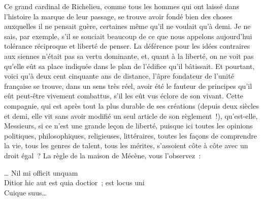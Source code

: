 \documentclass[french,twoside]{book} %
\newcommand\persName[1]{#1}
\newcommand{\dateline}[1]{\medskip{\RaggedLeft{#1}\par}\bigskip}
\newcommand{\salute}[1]{\bigbreak{#1}\par\medbreak}
\begin{document}
\dateline{3 avril 1879}

\salute{Messieurs,}
\noindent Ce grand {\persName cardinal de Richelieu}, comme tous les hommes qui ont laissé dans l’histoire la marque de leur passage, se trouve avoir fondé bien des choses auxquelles il ne pensait guère, certaines même qu’il ne voulait qu’à demi. Je ne sais, par exemple, s’il se souciait beaucoup de ce que nous appelons aujourd’hui tolérance réciproque et liberté de penser. La déférence pour les idées contraires aux siennes n’était pas sa vertu dominante, et, quant à la liberté, on ne voit pas qu’elle eût sa place indiquée dans le plan de l’édifice qu’il bâtissait. Et pourtant, voici qu’à deux cent cinquante ans de distance, l’âpre fondateur de l’unité française se trouve, dans un sens très réel, avoir été le fauteur de principes qu’il eût peut-être vivement combattus, s’il les eût vus éclore de son vivant. Cette compagnie, qui est après tout la plus durable de ses créations (depuis deux siècles et demi, elle vit sans avoir modifié un seul article de son règlement !), qu’est-elle, Messieurs, si ce n’est une grande leçon de liberté, puisque ici toutes les opinions politiques, philosophiques, religieuses, littéraires, toutes les façons de comprendre la vie, tous les genres de talent, tous les mérites, s’assoient côte à côte avec un droit égal ? La règle de la maison de Mécène, vous l’observez :\par

… Nil mi officit unquam  \\
Ditior hic aut est quia doctior ; est locus uni \\
Cuique suus…\\
\end{document}

